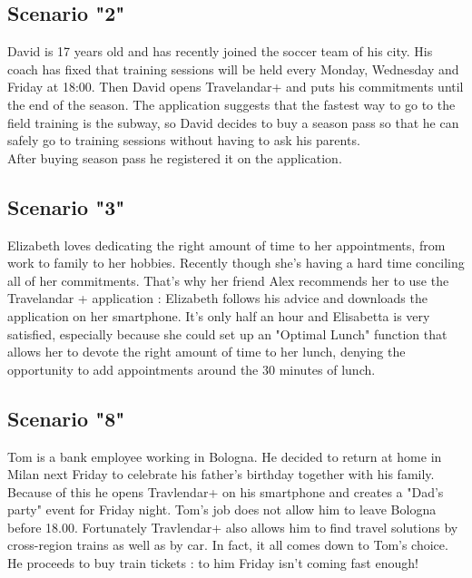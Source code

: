 \subsection{Scenario "2"}

David is 17 years old and has recently joined the soccer team of his city. His coach has fixed that training sessions will be held every Monday, Wednesday and Friday at 18:00. Then David opens Travelandar+ and puts his commitments until the end of the season. The application suggests that the fastest way to go to the field training is the subway, so David decides to buy a season pass so that he can safely go to training sessions without having to ask his parents.\\
After buying season pass he registered it on the application.


\subsection{Scenario "3"}

Elizabeth loves dedicating the right amount of time to her appointments, from work to family to her hobbies. Recently though she’s having a hard time conciling all of her commitments. That’s why her friend Alex recommends her to use the Travelandar + application : Elizabeth follows his advice and downloads the application on her smartphone. It’s only half an hour and Elisabetta is very satisfied, especially because she could set up an "Optimal Lunch" function that allows her to devote the right amount of time to her lunch, denying the opportunity to add appointments around the 30 minutes of lunch.

\subsection{Scenario "8"}

Tom is a bank employee working in Bologna. He decided to return at home in Milan next Friday to celebrate his father's birthday together with his family. Because of this he opens Travlendar+ on his smartphone and creates a "Dad's party" event for Friday night. Tom’s job does not allow him to leave Bologna before 18.00. Fortunately Travlendar+ also allows him to find travel solutions by cross-region trains as well as by car. In fact, it all comes down to Tom's choice. He proceeds to buy train tickets : to him Friday isn’t coming fast enough!